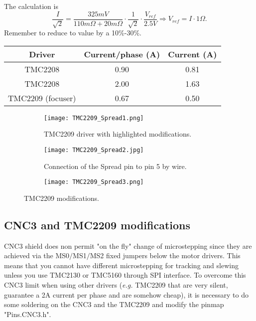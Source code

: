 The calculation is 
\[\frac{I}{\sqrt{2}}=\frac{325mV}{110m\Omega+20m\Omega}\cdot\frac{1}{\sqrt{2}}\cdot\frac{V_{ref}}{2.5V}\Rightarrow V_{ref} = I \cdot 1\Omega.\]
Remember to reduce to value by a 10\%-30\%.

\begin{minipage}
    {.4\textwidth}
    \begin{tabular}{ccc}
       Driver & Current/phase (A) & Current (A) \\
        \hline
       TMC2208 & 0.90 & 0.81 \\
       TMC2208 & 2.00 & 1.63 \\                
       TMC2209 (focuser) & 0.67 & 0.50                
    \end{tabular}
    \label{tab:drivers_curr}
\end{minipage} 

\begin{figure*}
    \begin{subfigure}[t!]
        {0.33\textwidth}
        \centering
        \texttt{[image: TMC2209\_Spread1.png]}
        \caption{TMC2209 driver with highlighted modifications. }
        \label{fig:tmc-spread1}
    \end{subfigure}
    \begin{subfigure}[t!]
        {0.33\textwidth}
        \centering
        \texttt{[image: TMC2209\_Spread2.jpg]}
        \caption{Connection of the Spread pin to pin 5 by wire.}
        \label{fig:tmc-spread2}
    \end{subfigure}
    \begin{subfigure}[t!]
        {0.33\textwidth}
        \centering
        \texttt{[image: TMC2209\_Spread3.png]}
        \label{fig:tmc-spread3}
    \end{subfigure}
    \caption{TMC2209 modifications.}
    \label{fig:cnc3-mod}    
\end{figure*}

\subsection{CNC3 and TMC2209 modifications}
CNC3 shield does non permit "on the fly" change of microstepping since they are achieved via the MS0\(/\)MS1\(/\)MS2 fixed jumpers below the motor drivers. This means that you cannot have different microstepping for tracking and slewing unless you use TMC2130 or TMC5160 through SPI interface. To overcome this CNC3 limit when using other drivers (\textit{e.g.} TMC2209 that are very silent, guarantee a 2A current per phase and are somehow cheap), it is necessary to do some soldering on the CNC3 and the TMC2209 and modify the pinmap "Pins.CNC3.h".
